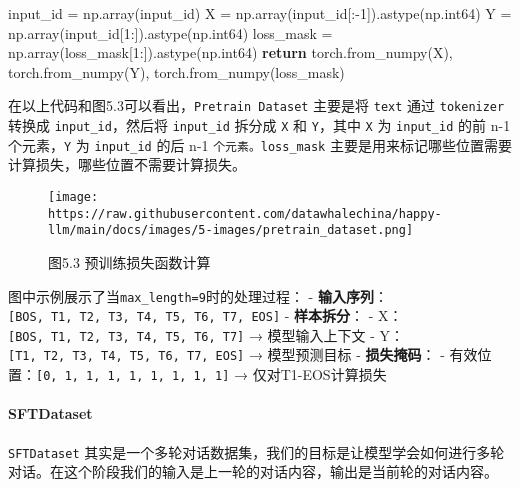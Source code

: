 \documentclass[
]{article}
\newenvironment{Shaded}{}{}
\newcommand{\ControlFlowTok}[1]{\textcolor[rgb]{0.00,0.44,0.13}{\textbf{#1}}}
\newcommand{\DecValTok}[1]{\textcolor[rgb]{0.25,0.63,0.44}{#1}}
\newcommand{\NormalTok}[1]{#1}
\newcommand{\OperatorTok}[1]{\textcolor[rgb]{0.40,0.40,0.40}{#1}}
\begin{document}
\begin{Shaded}
\begin{Highlighting}[]
\NormalTok{        input\_id }\OperatorTok{=}\NormalTok{ np.array(input\_id)}
\NormalTok{        X }\OperatorTok{=}\NormalTok{ np.array(input\_id[:}\OperatorTok{{-}}\DecValTok{1}\NormalTok{]).astype(np.int64)}
\NormalTok{        Y }\OperatorTok{=}\NormalTok{ np.array(input\_id[}\DecValTok{1}\NormalTok{:]).astype(np.int64)}
\NormalTok{        loss\_mask }\OperatorTok{=}\NormalTok{ np.array(loss\_mask[}\DecValTok{1}\NormalTok{:]).astype(np.int64)}
        \ControlFlowTok{return}\NormalTok{ torch.from\_numpy(X), torch.from\_numpy(Y), torch.from\_numpy(loss\_mask)}
\end{Highlighting}
\end{Shaded}

在以上代码和图5.3可以看出，\texttt{Pretrain\ Dataset} 主要是将
\texttt{text} 通过 \texttt{tokenizer} 转换成 \texttt{input\_id}，然后将
\texttt{input\_id} 拆分成 \texttt{X} 和 \texttt{Y}，其中 \texttt{X} 为
\texttt{input\_id} 的前 n-1 个元素，\texttt{Y} 为 \texttt{input\_id}
的后 n-1 \texttt{个元素。loss\_mask}
主要是用来标记哪些位置需要计算损失，哪些位置不需要计算损失。

\begin{figure}[htbp]\centering
\texttt{[image: https://raw.githubusercontent.com/datawhalechina/happy-llm/main/docs/images/5-images/pretrain\_dataset.png]}
\caption{图5.3 预训练损失函数计算}
\end{figure}

图中示例展示了当\texttt{max\_length=9}时的处理过程： -
\textbf{输入序列}：\texttt{{[}BOS,\ T1,\ T2,\ T3,\ T4,\ T5,\ T6,\ T7,\ EOS{]}}
- \textbf{样本拆分}： -
X：\texttt{{[}BOS,\ T1,\ T2,\ T3,\ T4,\ T5,\ T6,\ T7{]}} →
模型输入上下文 -
Y：\texttt{{[}T1,\ T2,\ T3,\ T4,\ T5,\ T6,\ T7,\ EOS{]}} → 模型预测目标
- \textbf{损失掩码}： -
有效位置：\texttt{{[}0,\ 1,\ 1,\ 1,\ 1,\ 1,\ 1,\ 1,\ 1{]}} →
仅对T1-EOS计算损失

\paragraph{SFTDataset}\label{sftdataset}

\texttt{SFTDataset}
其实是一个多轮对话数据集，我们的目标是让模型学会如何进行多轮对话。在这个阶段我们的输入是上一轮的对话内容，输出是当前轮的对话内容。
\end{document}
